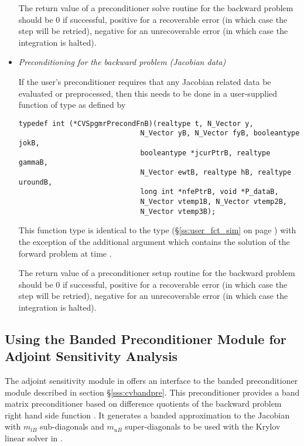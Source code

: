 \begin{itemize}
  The return value of a preconditioner solve routine for the backward
  problem should be $0$ if successful, 
  positive for a recoverable error (in which case the step will be retried),     
  negative for an unrecoverable error (in which case the integration is halted).

\item {\em Preconditioning for the backward problem
    (Jacobian data)}

  If the user's preconditioner requires that any Jacobian related data
  be evaluated or preprocessed, then this needs to be done in a
  user-supplied {\C} function of type  
  as defined by
\begin{verbatim}
typedef int (*CVSpgmrPrecondFnB)(realtype t, N_Vector y, 
                             N_Vector yB, N_Vector fyB, booleantype jokB, 
                             booleantype *jcurPtrB, realtype gammaB,
                             N_Vector ewtB, realtype hB, realtype uroundB,
                             long int *nfePtrB, void *P_dataB,
                             N_Vector vtemp1B, N_Vector vtemp2B,
                             N_Vector vtemp3B);
\end{verbatim}
  This function type is identical to the type 
  (\S\ref{ss:user_fct_sim} on page \pageref{p:precond}) with the exception
  of the additional argument  which contains the solution of the 
  forward problem at time .

  The return value of a preconditioner setup routine for the backward
  problem should be $0$ if successful, 
  positive for a recoverable error (in which case the step will be retried),     
  negative for an unrecoverable error (in which case the integration is halted).

\end{itemize}

\subsection{Using the Banded Preconditioner Module for Adjoint Sensitivity Analysis}

The adjoint sensitivity module in {\cvodes} offers an interface to the banded 
preconditioner module {\cvbandpre} described in section \S\ref{sss:cvbandpre}.
This preconditioner provides a band matrix preconditioner based on difference
quotients of the backward problem right hand side function . It generates
a banded approximation to the Jacobian with $m_{lB}$ sub-diagonals and $m_{uB}$
super-diagonals to be used with the Krylov linear solver in {\cvspgmr}.


